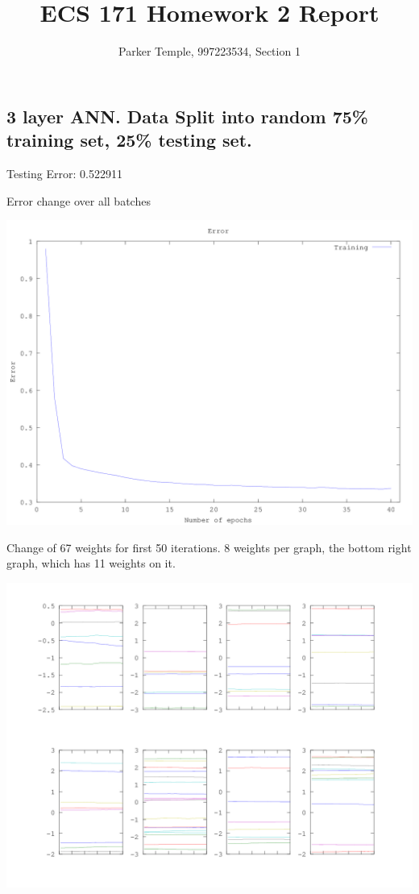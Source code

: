 \documentclass[10pt]{article}
\begin{document}
\title{\textbf{ECS 171 Homework 2 Report}}
\author{Parker Temple, 997223534, Section 1}
\maketitle

\begin{flushleft}

\section{3 layer ANN. Data Split into random 75\% training set, 25\% testing set.}

Testing Error: 0.522911

Error change over all batches

\includegraphics[width=\linewidth]{./errorplot.png}

\newpage

Change of 67 weights for first 50 iterations. 8 weights per graph, the bottom right graph, which has 11 weights on it.

\includegraphics[width=\linewidth]{./weightchange.png}


\end{flushleft}
\end{document}
